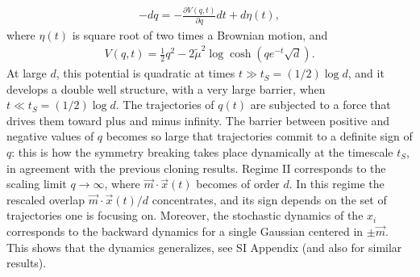 \documentclass[10pt,twocolumn]{article}
\begin{document}
\begin{align}\label{eq:qt}
   -dq=-\frac{\partial V(q,t)}{\partial q}dt+d\eta(t),
\end{align}
where $\eta(t)$ is square root of two times a Brownian motion, and
\begin{align}
    V(q,t)=\frac{1}{2}q^2-2\tilde \mu^2 \log \cosh\left(q  e^{-t} \sqrt{d}\right).
\end{align}
At large $d$, this potential is quadratic at times $t\gg t_S=(1/2) \log d$, and it develops a double well structure, with a very large barrier, when $t\ll t_S=(1/2) \log d$. The trajectories of $q(t)$  are subjected to a force that drives them toward plus and minus infinity. The barrier between positive and negative values of $q$ becomes so large that trajectories commit to a definite sign of $q$: this is how the symmetry breaking takes place dynamically at the timescale $t_S$, in agreement with the previous cloning results.
Regime II corresponds to the scaling limit $q\rightarrow \infty$, where $\vec m \cdot \vec x(t)$ becomes of order $d$. In this regime the rescaled overlap $\vec m \cdot\vec x(t)/d$ concentrates, and its sign depends on the set of trajectories one is focusing on. Moreover, the stochastic dynamics of the $x_i$ corresponds to the backward dynamics for a single Gaussian centered in $\pm \vec m$. This shows that the dynamics generalizes, see SI Appendix (and also \cite{ghio2023sampling} for similar results).
\end{document}
